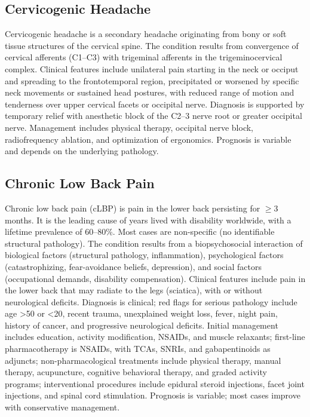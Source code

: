 \subsection{Cervicogenic Headache}
\label{sec:Cervicogenic Headache}
Cervicogenic headache is a secondary headache originating from bony or soft tissue structures of the cervical spine. The condition results from convergence of cervical afferents (C1--C3) with trigeminal afferents in the trigeminocervical complex. Clinical features include unilateral pain starting in the neck or occiput and spreading to the frontotemporal region, precipitated or worsened by specific neck movements or sustained head postures, with reduced range of motion and tenderness over upper cervical facets or occipital nerve. Diagnosis is supported by temporary relief with anesthetic block of the C2--3 nerve root or greater occipital nerve. Management includes physical therapy, occipital nerve block, radiofrequency ablation, and optimization of ergonomics. Prognosis is variable and depends on the underlying pathology.

\subsection{Chronic Low Back Pain}
\label{sec:Chronic Low Back Pain}
Chronic low back pain (cLBP) is pain in the lower back persisting for $\ge$3 months. It is the leading cause of years lived with disability worldwide, with a lifetime prevalence of 60--80\%. Most cases are non-specific (no identifiable structural pathology). The condition results from a biopsychosocial interaction of biological factors (structural pathology, inflammation), psychological factors (catastrophizing, fear-avoidance beliefs, depression), and social factors (occupational demands, disability compensation). Clinical features include pain in the lower back that may radiate to the legs (sciatica), with or without neurological deficits. Diagnosis is clinical; red flags for serious pathology include age >50 or <20, recent trauma, unexplained weight loss, fever, night pain, history of cancer, and progressive neurological deficits. Initial management includes education, activity modification, NSAIDs, and muscle relaxants; first-line pharmacotherapy is NSAIDs, with TCAs, SNRIs, and gabapentinoids as adjuncts; non-pharmacological treatments include physical therapy, manual therapy, acupuncture, cognitive behavioral therapy, and graded activity programs; interventional procedures include epidural steroid injections, facet joint injections, and spinal cord stimulation. Prognosis is variable; most cases improve with conservative management.

